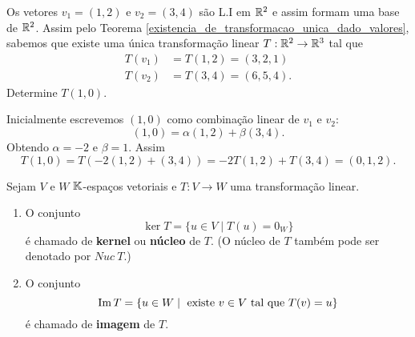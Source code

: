 \begin{exemplo}
  Os vetores $v_1 = (1,2)$ e $v_2 = (3,4)$ s\~ao L.I em $\mathbb{R}^2$ e assim formam uma base de $\mathbb{R}^2$. Assim pelo Teorema \ref{existencia_de_transformacao_unica_dado_valores}, sabemos que existe uma \'unica transforma\c{c}\~ao linear $T : \mathbb{R}^2 \to \mathbb{R}^3$ tal que
  \begin{align*}
    T(v_1) &= T(1,2) = (3,2,1)\\
    T(v_2) &= T(3,4) = (6,5,4).
  \end{align*}
  Determine $T(1,0)$.
\end{exemplo}
\begin{solucao}
  Inicialmente escrevemos $(1,0)$ como combina\c{c}\~ao linear de $v_1$ e $v_2$:
  \[
    (1, 0) = \alpha(1,2) + \beta(3,4).
  \]
  Obtendo $\alpha = -2$ e $\beta = 1$. Assim
  \[
    T(1,0) = T(-2(1,2) + (3,4)) = -2T(1,2) + T(3,4) = (0,1,2).
  \]
\end{solucao}

\begin{definicao}
  Sejam $V$ e $W$ $\mathbb{K}$-espa\c{c}os vetoriais e $T : V \to W$ uma transforma\c{c}\~ao linear.
  \begin{enumerate}[label={\roman*})]
    \item O conjunto
    \[
      \ker T = \{u \in V \mid T(u) = 0_W\}
    \]
    \'e chamado de \textbf{kernel} ou \textbf{n\'ucleo} de $T$. (O n\'ucleo de $T$ tamb\'em pode ser denotado por $Nuc\ T$.)

    \item O conjunto
    \[
      {\rm Im\,} T = \{u \in W \mid \mbox{ existe } v \in V \mbox{ tal que } T(v) = u\}
    \]
    \'e chamado de \textbf{imagem} de $T$.
  \end{enumerate}
\end{definicao}

